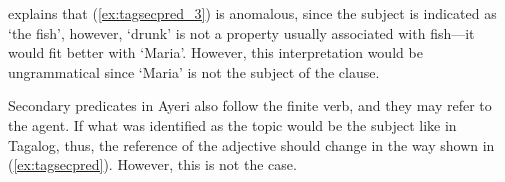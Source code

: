 \begin{figure}[h]

\xe
\end{figure}

\citet[30]{kroeger1991} explains that (\ref{ex:tagsecpred_3}) is anomalous,
since the subject is indicated as  `the fish', however,
 `drunk' is not a property usually associated with fish---it would
fit better with `Maria'. However, this interpretation would be ungrammatical
since `Maria' is not the subject of the clause.

Secondary predicates in Ayeri also follow the finite verb, and they may refer
to the agent. If what was identified as the topic would be the subject like in
Tagalog, thus, the reference of the adjective should change in the way shown in
(\ref{ex:tagsecpred}). However, this is not the case.

